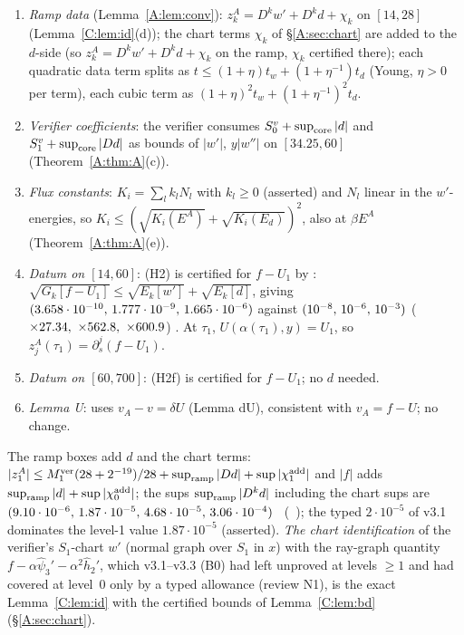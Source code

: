 \documentclass[11pt]{article}
\begin{document}
\begin{remark}\label{A:rem:B0}
\begin{enumerate}[label=(I\arabic*),leftmargin=2.4em]
\item \emph{Ramp data} (Lemma~\ref{A:lem:conv}): $z^A_k=D^k w'+D^kd+\chi_k$ on $[14,28]$ (Lemma~\ref{C:lem:id}(d)); the chart terms $\chi_k$ of \S\ref{A:sec:chart} are added to the $d$-side (so $z^A_k=D^kw'+D^kd+\chi_k$ on the ramp, $\chi_k$ certified there); each quadratic data term splits as $t\le(1+\eta)t_w+(1+\eta^{-1})t_d$ (Young, $\eta>0$ per term), each cubic term as $(1+\eta)^2t_w+(1+\eta^{-1})^2t_d$.
\item \emph{Verifier coefficients}: the verifier consumes $S^v_0+\sup_{\rm core}|d|$ and $S^v_1+\sup_{\rm core}|Dd|$ as bounds of $|w'|$, $y|w''|$ on $[34.25,60]$ (Theorem~\ref{A:thm:A}(c)).
\item \emph{Flux constants}: $K_i=\sum_lk_lN_l$ with $k_l\ge0$ (asserted) and $N_l$ linear in the $w'$-energies, so $K_i\le(\sqrt{K_i(E^A)}+\sqrt{K_i(E_d)})^2$, also at $\beta E^A$ (Theorem~\ref{A:thm:A}(e)).
\item \emph{Datum on $[14,60]$}: (H2) is certified for $f-U_1$ by : $\sqrt{G_k[f-U_1]}\le\sqrt{E_k[w']}+\sqrt{E_k[d]}$, giving $(3.658\cdot10^{-10},\,1.777\cdot10^{-9},\,1.665\cdot10^{-6})$ against $(10^{-8},\,10^{-6},\,10^{-3})$ ($\times27.34,\ \times562.8,\ \times600.9$) \tC. At $\tau_1$, $U(\alpha(\tau_1),y)=U_1$, so $z^A_j(\tau_1)=\partial_s^j(f-U_1)$.
\item \emph{Datum on $[60,700]$}: (H2f) is certified for $f-U_1$; no $d$ needed.
\item \emph{Lemma U}: uses $v_A-v=\delta U$ (Lemma dU), consistent with $v_A=f-U$; no change.
\end{enumerate}
The ramp boxes add $d$ and the chart terms: $|z^A_1|\le M_1^{\rm ver}(28+2^{-19})/28+\sup_{\rm ramp}|Dd|+\sup|\chi^{\rm add}_1|$ and $|f|$ adds $\sup_{\rm ramp}|d|+\sup|\chi^{\rm add}_0|$; the sups $\sup_{\rm ramp}|D^kd|$ including the chart sups are $(9.10\cdot10^{-6},\,1.87\cdot10^{-5},\,4.68\cdot10^{-5},\,3.06\cdot10^{-4})$ \tC\ (\SA\ ); the typed $2\cdot10^{-5}$ of v3.1 dominates the level-1 value $1.87\cdot10^{-5}$ (asserted). \emph{The chart identification} of the verifier's $S_1$-chart $w'$ (normal graph over $S_1$ in $x$) with the ray-graph quantity $f-\alpha\hat\psi_3'-\alpha^2\hat h_2'$, which v3.1--v3.3 (B0) had left unproved at levels $\ge1$ and had covered at level~0 only by a typed allowance (review N1), is the exact Lemma~\ref{C:lem:id} with the certified bounds of Lemma~\ref{C:lem:bd} (\S\ref{A:sec:chart}).
\end{remark}
\end{document}
